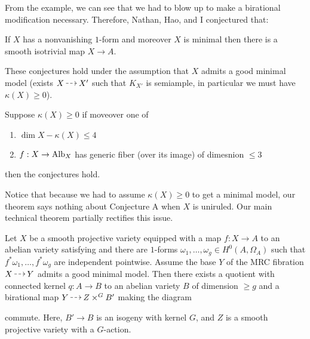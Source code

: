 \documentclass[12pt]{article}
\begin{document}
From the example, we can see that we had to blow up to make a birational modification necessary. Therefore, Nathan, Hao, and I conjectured that:

\begin{conj}
If $X$ has a nonvanishing $1$-form and moreover $X$ is minimal then there is a smooth isotrivial map $X \to A$.
\end{conj}


\begin{theorem}[C '24]
These conjectures hold under the assumption that $X$ admits a good minimal model (exists $X \rat X'$ such that $K_{X'}$ is semiample, in particular we must have $\kappa(X) \ge 0$). 
\end{theorem}

\begin{cor}
Suppose $\kappa(X) \ge 0$ if moveover one of 
\begin{enumerate}
\item $\dim{X} - \kappa(X) \le 4$
\item $f : X \to \mathrm{Alb}_X$ has generic fiber (over its image) of dimesnion $\le 3$
\end{enumerate} 
then the conjectures hold.
\end{cor}

Notice that because we had to assume $\kappa(X) \ge 0$ to get a minimal model, our theorem says nothing about Conjecture A when $X$ is uniruled. Our main technical theorem partially rectifies this issue.

\begin{theorem} \label{thm:main_MRC}
Let $X$ be a smooth projective variety equipped with a map $f : X \to A$ to an abelian variety satisfying and there are $1$-forms $\omega_1, \dots, \omega_g \in H^0(A, \Omega_A)$ such that $f^* \omega_1, \dots, f^* \omega_g$ are independent pointwise. Assume the base $Y$ of the MRC fibration $X \rat Y$ admits a good minimal model. Then there exists a quotient with connected kernel $q : A \to B$ to an abelian variety $B$ of dimension $\ge g$ and a birational map $Y \rat Z \times^G B'$ making the diagram
\begin{center}
\end{center}
commute. Here, $B' \to B$ is an isogeny with kernel $G$, and $Z$ is a smooth projective variety with a $G$-action. 
\end{theorem}
\end{document}
